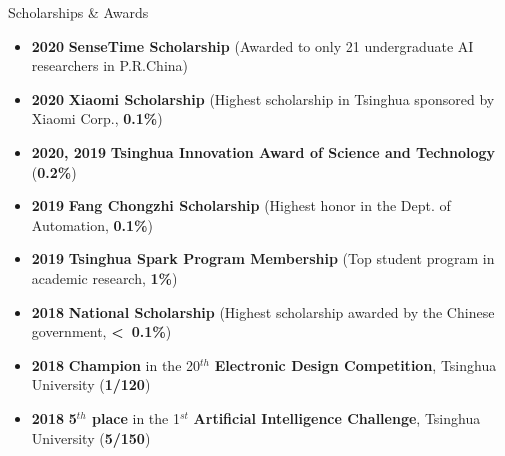 \documentclass{resume} %
\begin{document}
\begin{rSection}{Scholarships \& Awards}
\begin{itemize}
    \item \textbf{2020} \textbf{SenseTime Scholarship} (Awarded to only 21 undergraduate AI researchers in P.R.China)
    \item \textbf{2020} \textbf{Xiaomi Scholarship} (Highest scholarship in Tsinghua sponsored by Xiaomi Corp., \textbf{0.1\%})
    \item \textbf{2020, 2019} \textbf{Tsinghua Innovation Award of Science and Technology} (\textbf{0.2\%})
    \item \textbf{2019} \textbf{Fang Chongzhi Scholarship} (Highest honor in the Dept. of Automation, \textbf{0.1\%})
    \item \textbf{2019} \textbf{Tsinghua Spark Program Membership} (Top student program in academic research, \textbf{1\%})
    \item \textbf{2018} \textbf{National Scholarship} (Highest scholarship awarded by the Chinese government, \textbf{\textless~0.1\%})
    \item \textbf{2018} \textbf{Champion} in the 20$^{th}$ \textbf{Electronic Design Competition}, Tsinghua University (\textbf{1/120})%
    \item \textbf{2018} \textbf{5$^{th}$ place} in the 1$^{st}$ \textbf{Artificial Intelligence Challenge}, Tsinghua University (\textbf{5/150})%
    \newline
\end{itemize}

\end{rSection}

\vspace{-0.2cm}
\end{document}
